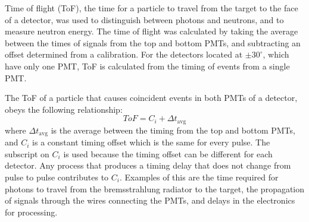 Time of flight (ToF), the time for a particle to travel from the target to the face of a detector, was used to distinguish between photons and neutrons, and to measure neutron energy.
The time of flight was calculated by taking the average between the times of signals from the top and bottom PMTs, and subtracting an offset determined from a calibration.
For the detectors located at $\pm30^{\circ}$, which have only one PMT, ToF is calculated from the timing of events from a single PMT.

The ToF of a particle that causes coincident events in both PMTs of a detector, obeys the following relationship:
\begin{displaymath}
ToF = C_i + \Delta t_{\text{avg}} 
\end{displaymath}
where $\Delta t_{\text{avg}} $ is the average between the timing from the top and bottom PMTs, and $C_i$ is a constant timing offset which is the same for every pulse.
The subscript on $C_i$ is used because the timing offset can be different for each detector.
Any process that produces a timing delay that does not change from pulse to pulse contributes to $C_{i}$.
Examples of this are the time required for photons to travel from the bremsstrahlung radiator to the target, the propagation of signals through the wires connecting the PMTs, and delays in the electronics for processing.

